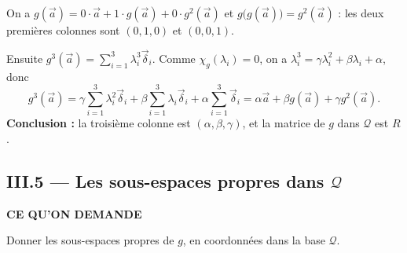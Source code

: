 \documentclass[a4paper,11pt]{article}
\numberwithin{equation}{section}
\numberwithin{figure}{section}
\numberwithin{table}{section}
\theoremstyle{enonce}
\theoremstyle{exemple}
\theoremstyle{remarque}
\newcounter{exo}[section]
\newcommand{\va}{\vec a}\newcommand{\vb}{\vec b}\newcommand{\vz}{\vec 0}\newcommand{\dd}[1]{\vec\delta_{#1}}
\newcommand{\Qc}{\mathcal Q}
\newcommand{\Enonce}[1]{\begin{enoncebox}{\sffamily\bfseries\footnotesize\color{Bleu}CE QU'ON DEMANDE}\par\smallskip #1\end{enoncebox}}
\begin{document}
\begin{copie}
On a $g(\va)=0\cdot\va+1\cdot g(\va)+0\cdot g^2(\va)$ et $g\big(g(\va)\big)=g^2(\va)$ : les deux premières colonnes sont
$(0,1,0)$ et $(0,0,1)$.

Ensuite $g^3(\va)=\sum_{i=1}^3\lambda_i^3\dd i$. Comme $\chi_g(\lambda_i)=0$, on a $\lambda_i^3=\gamma\lambda_i^2+\beta\lambda_i+\alpha$,
donc
\[g^3(\va)=\gamma\sum_{i=1}^3\lambda_i^2\dd i+\beta\sum_{i=1}^3\lambda_i\dd i+\alpha\sum_{i=1}^3\dd i
=\alpha\va+\beta g(\va)+\gamma g^2(\va).\]
\textbf{Conclusion :} la troisième colonne est $(\alpha,\beta,\gamma)$, et la matrice de $g$ dans $\Qc$ est $R$.
\end{copie}

\clearpage
\subsection{III.5 — Les sous-espaces propres dans \texorpdfstring{$\Qc$}{Q}}\label{q:iii5}

\Enonce{Donner les sous-espaces propres de $g$, en coordonnées dans la base $\Qc$.}
\end{document}
